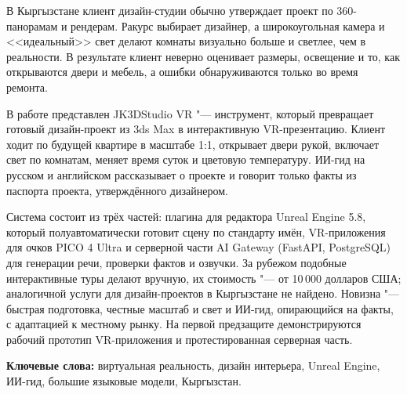 В Кыргызстане клиент дизайн-студии обычно утверждает проект по 360\textdegree-панорамам и рендерам. Ракурс выбирает дизайнер, а широкоугольная камера и <<идеальный>> свет делают комнаты визуально больше и светлее, чем в реальности. В результате клиент неверно оценивает размеры, освещение и то, как открываются двери и мебель, а ошибки обнаруживаются только во время ремонта.

В работе представлен JK3DStudio VR "--- инструмент, который превращает готовый дизайн-проект из 3ds Max в интерактивную VR-презентацию. Клиент ходит по будущей квартире в масштабе 1:1, открывает двери рукой, включает свет по комнатам, меняет время суток и цветовую температуру. ИИ-гид на русском и английском рассказывает о проекте и говорит только факты из паспорта проекта, утверждённого дизайнером.

Система состоит из трёх частей: плагина для редактора Unreal Engine 5.8, который полуавтоматически готовит сцену по стандарту имён, VR-приложения для очков PICO 4 Ultra и серверной части AI Gateway (FastAPI, PostgreSQL) для генерации речи, проверки фактов и озвучки. За рубежом подобные интерактивные туры делают вручную, их стоимость "--- от 10\,000 долларов США; аналогичной услуги для дизайн-проектов в Кыргызстане не найдено. Новизна "--- быстрая подготовка, честные масштаб и свет и ИИ-гид, опирающийся на факты, с адаптацией к местному рынку. На первой предзащите демонстрируются рабочий прототип VR-приложения и протестированная серверная часть.

\medskip\noindent\textbf{Ключевые слова:} виртуальная реальность, дизайн интерьера, Unreal Engine, ИИ-гид, большие языковые модели, Кыргызстан.
